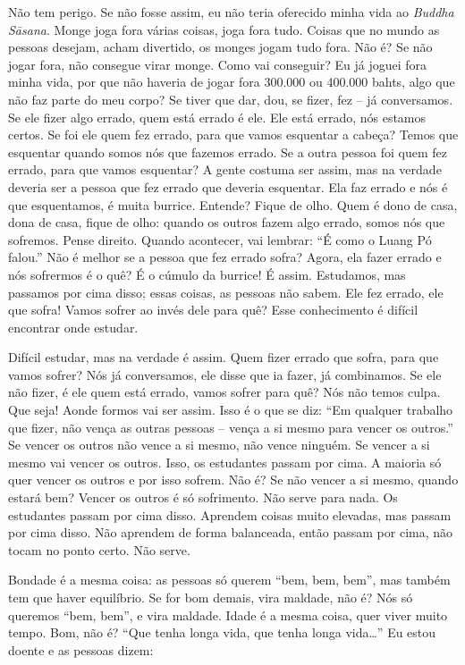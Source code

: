 Não tem perigo. Se não fosse assim, eu não teria oferecido minha
vida ao \textit{Buddha S\=asana}. Monge joga fora várias coisas, joga
fora tudo. Coisas que no mundo as pessoas desejam, acham divertido, os
monges jogam tudo fora. Não é? Se não jogar fora, não consegue virar
monge. Como vai conseguir? Eu já joguei fora minha vida, por que não
haveria de jogar fora 300.000 ou 400.000 bahts, algo que não faz parte
do meu corpo? Se tiver que dar, dou, se fizer, fez – já conversamos. Se
ele fizer algo errado, quem está errado é ele. Ele está errado, nós
estamos certos. Se foi ele quem fez errado, para que vamos esquentar a
cabeça? Temos que esquentar quando somos nós que fazemos errado. Se a
outra pessoa foi quem fez errado, para que vamos esquentar? A gente
costuma ser assim, mas na verdade deveria ser a pessoa que fez errado
que deveria esquentar. Ela faz errado e nós é que esquentamos, é muita
burrice. Entende? Fique de olho. Quem é dono de casa, dona de casa,
fique de olho: quando os outros fazem algo errado, somos nós que
sofremos. Pense direito. Quando acontecer, vai lembrar: “É como o Luang
Pó falou.” Não é melhor se a pessoa que fez errado sofra? Agora, ela
fazer errado e nós sofrermos é o quê? É o cúmulo da burrice! É assim.
Estudamos, mas passamos por cima disso; essas coisas, as pessoas não
sabem. Ele fez errado, ele que sofra! Vamos sofrer ao invés dele para
quê? Esse conhecimento é difícil encontrar onde estudar.

Difícil estudar, mas na verdade é assim. Quem fizer errado que
sofra, para que vamos sofrer? Nós já conversamos, ele disse que ia
fazer, já combinamos. Se ele não fizer, é ele quem está errado, vamos
sofrer para quê? Nós não temos culpa. Que seja! Aonde formos vai ser
assim. Isso é o que se diz: “Em qualquer trabalho que fizer, não vença
as outras pessoas – vença a si mesmo para vencer os outros.” Se vencer
os outros não vence a si mesmo, não vence ninguém. Se vencer a si mesmo
vai vencer os outros. Isso, os estudantes passam por cima. A maioria só
quer vencer os outros e por isso sofrem. Não é? Se não vencer a si
mesmo, quando estará bem? Vencer os outros é só sofrimento. Não serve
para nada. Os estudantes passam por cima disso. Aprendem coisas muito
elevadas, mas passam por cima disso. Não aprendem de forma balanceada,
então passam por cima, não tocam no ponto certo. Não serve.

Bondade é a mesma coisa: as pessoas só querem “bem, bem, bem”, mas
também tem que haver equilíbrio. Se for bom demais, vira maldade, não
é? Nós só queremos “bem, bem”, e vira maldade. Idade é a mesma coisa,
quer viver muito tempo. Bom, não é? “Que tenha longa vida, que tenha
longa vida…” Eu estou doente e as pessoas dizem: 

